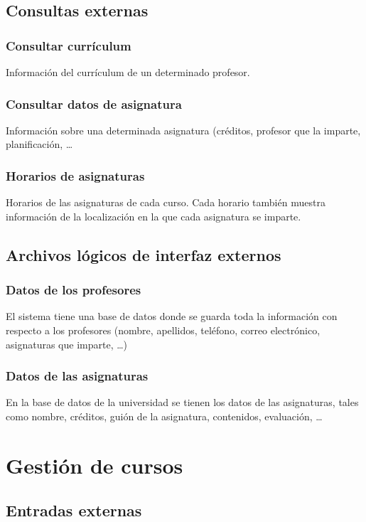 \documentclass[11pt,a4paper,spanish,twoside]{book}
\begin{document}
\subsection{Consultas externas}
\subsubsection{Consultar currículum}

Información del currículum de un determinado profesor.

\subsubsection{Consultar datos de asignatura} 
Información sobre una determinada asignatura (créditos, profesor que la
imparte, planificación, \dots

\subsubsection{Horarios de asignaturas}
Horarios de las asignaturas de cada curso. Cada horario
también muestra información de la localización en la que cada asignatura se
imparte. 

\subsection{Archivos lógicos de interfaz externos}
\subsubsection{Datos de los profesores}
El sistema tiene una base de datos donde se guarda toda la información con
respecto a los profesores (nombre, apellidos, teléfono, correo electrónico,
asignaturas que imparte, \dots)

\subsubsection{Datos de las asignaturas}
En la base de datos de la universidad se tienen los datos de las asignaturas,
tales como nombre, créditos, guión de la asignatura, contenidos, evaluación,
\dots 


\section{Gestión de cursos}
\subsection{Entradas externas}
\end{document}
